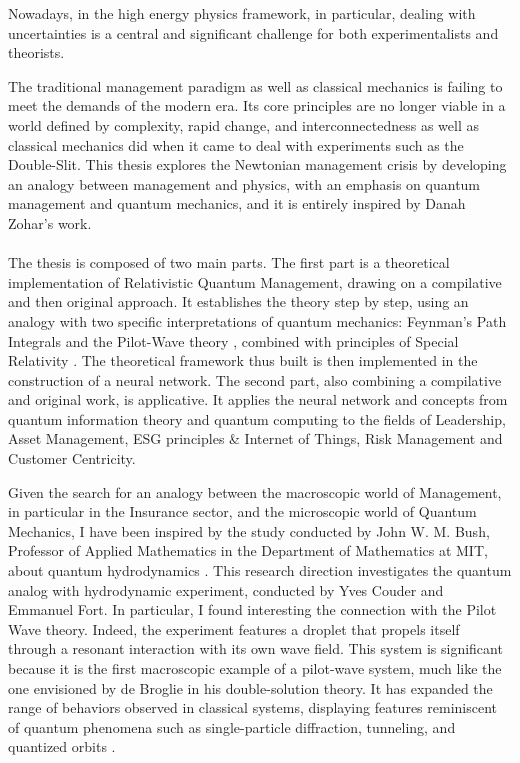\documentclass{article}
\begin{document}
Nowadays, in the high energy physics framework, in particular, dealing with uncertainties is a central and significant challenge for both experimentalists and theorists. 

The traditional management paradigm as well as classical mechanics is failing to meet the demands of the modern era. Its core principles are no longer viable in a world defined by complexity, rapid change, and interconnectedness as well as classical mechanics did when it came to deal with experiments such as the Double-Slit. This thesis explores the Newtonian management crisis by developing an analogy between management and physics, with an emphasis on quantum management and quantum mechanics, and it is entirely inspired by Danah Zohar's work.\\\\
The thesis is composed of two main parts. The first part is a theoretical implementation of Relativistic Quantum Management, drawing on a compilative and then original approach. It establishes the theory step by step, using an analogy with two specific interpretations of quantum mechanics: Feynman's Path Integrals \cite{feynman1963theory} and the Pilot-Wave theory \cite{bohm1952suggested1}, \cite{debroglie1927nouvelle} combined with principles of Special Relativity \cite{einstein1905elektrodynamik}. The theoretical framework thus built is then implemented in the construction of a neural network. The second part, also combining a compilative and original work, is applicative. It applies the neural network and concepts from quantum information theory and quantum computing to the fields of Leadership, Asset Management, ESG principles \& Internet of Things, Risk Management and Customer Centricity.

Given the search for an analogy between the macroscopic world of Management, in particular in the Insurance sector, and the microscopic world of Quantum Mechanics, I have been inspired by the study conducted by John W. M. Bush, Professor of Applied Mathematics in the Department of Mathematics at MIT, about quantum hydrodynamics \cite{dagan2020hydrodynamic}. This research direction investigates the quantum analog with hydrodynamic experiment, conducted by Yves Couder and Emmanuel Fort. In particular, I found interesting the connection with the Pilot Wave theory. Indeed, the experiment features a droplet that propels itself through a resonant interaction with its own wave field. This system is significant because it is the first macroscopic example of a pilot-wave system, much like the one envisioned by de Broglie in his double-solution theory. It has expanded the range of behaviors observed in classical systems, displaying features reminiscent of quantum phenomena such as single-particle diffraction, tunneling, and quantized orbits \cite{dagan2020hydrodynamic}.
\end{document}
